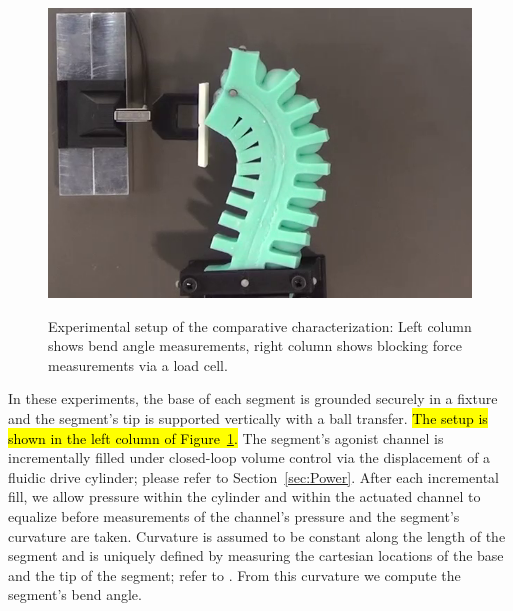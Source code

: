 \begin{figure}
{\includegraphics[width=0.47\columnwidth, trim = 15mm 6mm 55mm 25mm, clip]
{figures/actuators/expsetup/force/force_pleat_final.png}
\label{force_pleat_fin}}
\caption[Experimental setup of the comparative characterization]{Experimental setup of the comparative characterization: Left column shows bend angle measurements, right column shows blocking force measurements via a load cell.}\label{fig:characterization_setup}
\end{figure}
%
In these experiments, the base of each segment is grounded securely in a fixture and the segment's tip is supported vertically with a ball transfer. %
%
\hl{The setup is shown in the left column of Figure~\mbox{\ref{fig:characterization_setup}}.}
%
The segment's agonist channel is incrementally filled under closed-loop volume control via the displacement of a fluidic drive cylinder; please refer to Section~\ref{sec:Power}.
%
After each incremental fill, we allow pressure within the cylinder and within the actuated channel to equalize before measurements of the channel's pressure and the segment's curvature are taken.
%
Curvature is assumed to be constant along the length of the segment and is uniquely defined by measuring the cartesian locations of the base and the tip of the segment; refer to \citet{marchese2014design}.
%
From this curvature we compute the segment's bend angle.

